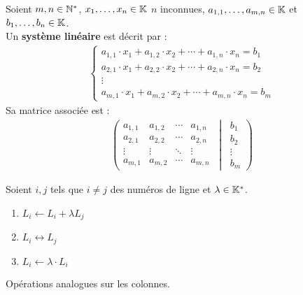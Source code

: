 \begin{definition}
    Soient $m, n \in \mathbb{N}^*$, $x_1, \ldots, x_n \in \mathbb{K}$ $n$ inconnues, $a_{1, 1}, \ldots, a_{m,n} \in \mathbb{K}$ et $b_1, \ldots, b_n \in \mathbb{K}$.
    \\
    Un \textbf{système linéaire} est décrit par :
    \begin{align*}
        \begin{cases}
            a_{1,1} \cdot x_1 + a_{1,2} \cdot x_2 + \cdots + a_{1,n} \cdot x_n = b_1 \\
            a_{2,1} \cdot x_1 + a_{2,2} \cdot x_2 + \cdots + a_{2,n} \cdot x_n = b_2 \\
            \vdots \\
            a_{m,1} \cdot x_1 + a_{m,2} \cdot x_2 + \cdots + a_{m,n} \cdot x_n = b_m
        \end{cases}
    \end{align*}        
    Sa matrice associée est : 
    \begin{align*}
        \left(
        \begin{matrix}    
            a_{1,1} & a_{1,2} & \cdots & a_{1,n} \\
            a_{2,1} & a_{2,2} & \cdots & a_{2,n} \\
            \vdots & \vdots & \ddots & \vdots \\
            a_{m,1} & a_{m,2} & \cdots & a_{m,n}
        \end{matrix}
        \
        \middle|
        \
        \begin{matrix}
            b_1 \\
            b_2 \\
            \vdots \\
            b_m
        \end{matrix}
        \right)
    \end{align*}
\end{definition}

\begin{definition}
	Soient $i, j$ tels que $i \neq j$ des numéros de ligne et $\lambda \in \mathbb{K}^*$.
	\begin{enumerate}
		\item $L_i \leftarrow L_i + \lambda L_j$ 
		\item $L_i \leftrightarrow L_j$
		\item $L_i \leftarrow \lambda \cdot L_i$
	\end{enumerate}
	Opérations analogues sur les colonnes.
\end{definition}

